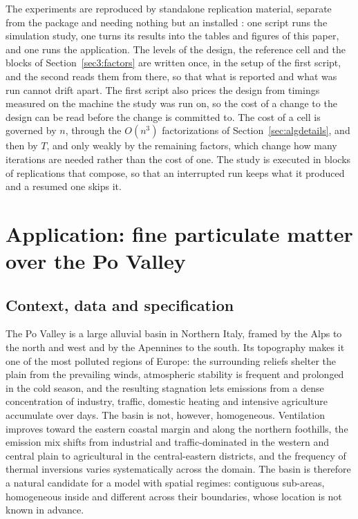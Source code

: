 The experiments are reproduced by standalone replication material, separate from the package and needing nothing but an installed \Stem{}: one script runs the simulation study, one turns its results into the tables and figures of this paper, and one runs the application. The levels of the design, the reference cell and the blocks of Section~\ref{sec3:factors} are written once, in the setup of the first script, and the second reads them from there, so that what is reported and what was run cannot drift apart. The first script also prices the design from timings measured on the machine the study was run on, so the cost of a change to the design can be read before the change is committed to. The cost of a cell is governed by $n$, through the $O(n^3)$ factorizations of Section~\ref{sec:algdetails}, and then by $T$, and only weakly by the remaining factors, which change how many iterations are needed rather than the cost of one. The study is executed in blocks of replications that compose, so that an interrupted run keeps what it produced and a resumed one skips it.

\section{Application: fine particulate matter over the Po Valley}\label{sec4}

\subsection{Context, data and specification}\label{sec4:data}

The Po Valley is a large alluvial basin in Northern Italy, framed by the Alps to the north and west and by the Apennines to the south. Its topography makes it one of the most polluted regions of Europe: the surrounding reliefs shelter the plain from the prevailing winds, atmospheric stability is frequent and prolonged in the cold season, and the resulting stagnation lets emissions from a dense concentration of industry, traffic, domestic heating and intensive agriculture accumulate over days. The basin is not, however, homogeneous. Ventilation improves toward the eastern coastal margin and along the northern foothills, the emission mix shifts from industrial and traffic-dominated in the western and central plain to agricultural in the central-eastern districts, and the frequency of thermal inversions varies systematically across the domain. The basin is therefore a natural candidate for a model with spatial regimes: contiguous sub-areas, homogeneous inside and different across their boundaries, whose location is not known in advance.

